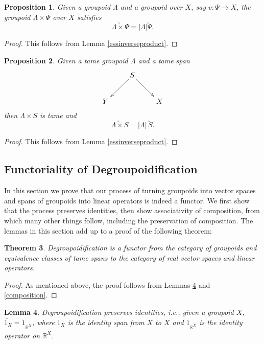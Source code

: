 \documentclass{article}
\renewcommand{\to}{\rightarrow}
\newcommand{\maps}{\colon}
\newcommand{\R}{{\mathbb R}}
\newtheorem{thm}{Theorem}
\newtheorem{lemma}[thm]{Lemma}
\newtheorem{proposition}[thm]{Proposition}
\begin{document}
\begin{proposition}
\label{scalarmult1}
Given a groupoid $\Lambda$ and a groupoid over $X$, 
say $v \maps \Psi \to X$, the groupoid
$\Lambda \times \Psi$ over $X$ satisfies
\[\utilde{\Lambda \times \Psi} = |\Lambda|\utilde{\Psi}.\]
\end{proposition}
\begin{proof} This follows from Lemma \ref{essinverseproduct}.
\end{proof}

\begin{proposition}
\label{scalarmult2}
Given a tame groupoid $\Lambda$ and a tame span
\[
\xymatrix{
& S\ar[dl] \ar[dr] & \\
Y & & X
}
\]
then $\Lambda \times S$ is tame and
\[\utilde{\Lambda \times S} = |\Lambda| \, \utilde{S}.\]
\end{proposition}
\begin{proof} This follows from Lemma \ref{essinverseproduct}.
\end{proof}

\subsection{Functoriality of Degroupoidification}

In this section we prove that our process of turning groupoids into
vector spaces and spans of groupoids into linear operators is indeed a
functor. We first show that the process preserves identities, then
show associativity of composition, from which many other things
follow, including the preservation of composition.  The lemmas in this
section add up to a proof of the following theorem:

\begin{thm}\label{functor}
Degroupoidification is a functor from the category of groupoids
and equivalence classes of tame spans to the category of real
vector spaces and linear operators.
\end{thm}

\begin{proof}
As mentioned above, the proof follows from Lemmas \ref{identities} and
\ref{composition}.
\end{proof}

\begin{lemma}\label{identities}
Degroupoidification preserves identities, i.e., given a groupoid $X$,
$\utilde{1_X} = 1_{\R^{\utilde{X}}}$, where $1_X$ is the identity span
from $X$ to $X$ and $1_{\R^{\utilde{X}}}$ is the identity operator on
$\R^{\utilde{X}}$.
\end{lemma}
\end{document}
